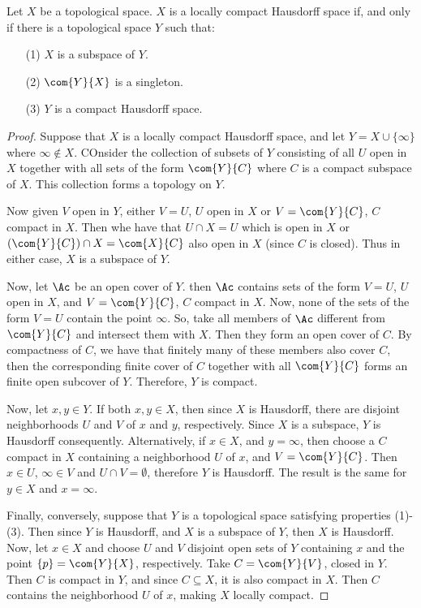 \begin{theorem}\label{3.8.1}
    Let $X$ be a topological space. $X$ is a locally compact Hausdorff space if,
    and only if there is a topological space $Y$ such that:
    \begin{enumerate}
        \item[(1)] $X$ is a subspace of  $Y$.

        \item[(2)] $\com{Y}{X}$ is a singleton.

        \item[(3)] $Y$ is a compact Hausdorff space.
    \end{enumerate}

\end{theorem}
\begin{proof}
    Suppose that  $X$ is a locally compact Hausdorff space, and let $Y=X
    \cup \{\infty\}$ where $\infty \notin X$. COnsider the collection of
    subsets of  $Y$ consisting of all $U$ open in  $X$ together with all sets of
    the form $\com{Y}{C}$ where $C$ is a compact subspace of  $X$. This
    collection forms a topology on  $Y$.

    Now given $V$ open in  $Y$, either  $V=U$,  $U$ open in  $X$ or
    $V=\com{Y}{C}$, $C$ compact in $X$. Then whe have that $U \cap X=U$ which is
    open in $X$ or  $(\com{Y}{C}) \cap X=\com{X}{C}$ also open in $X$  (since
    $C$ is closed). Thus in either case, $X$ is a subspace of $Y$.

    Now, let  $\Ac$ be an open cover of  $Y$. then  $\Ac$ contains sets of the
    form  $V=U$, $U$ open in $X$, and  $V=\com{Y}{C}$, $C$ compact in  $X$.
    Now, none of the sets of the form  $V=U$ contain the point  $\infty$. So,
    take all members of  $\Ac$ different from  $\com{Y}{C}$ and intersect them
    with $X$. Then they form an open cover of  $C$. By compactness of $C$, we
    have that finitely many of these members also cover  $C$, then the
    corresponding finite cover of  $C$ together with all  $\com{Y}{C}$ forms an
    finite open subcover of $Y$. Therefore,  $Y$ is compact.

    Now, let  $x,y \in Y$. If both  $x,y \in X$, then since  $X$ is Hausdorff,
    there are disjoint neighborhoods $U$ and $V$ of  $x$ and  $y$, respectively.
    Since $X$ is a subspace, $Y$ is Hausdorff consequently. Alternatively, if $x
    \in X$, and  $y=\infty$, then choose a $C$ compact in $X$ containing a
    neighborhood  $U$ of  $x$, and  $V=\com{Y}{C}$. Then $x \in U$, $\infty \in
    V$ and  $U \cap V=\emptyset$, therefore  $Y$ is Hausdorff. The result is the
    same for  $y \in X$ and  $x=\infty$.

    Finally, conversely, suppose that  $Y$ is a topological space satisfying
    properties (1)-(3). Then since $Y$ is Hausdorff, and  $X$ is a subspace of
    $Y$, then  $X$ is Hausdorff. Now, let $x \in X$ and choose $U$ and $V$
    disjoint open sets of $Y$ containing $x$ and the point $\{p\}=\com{Y}{X}$,
    respectively. Take $C=\com{Y}{V}$, closed in $Y$. Then  $C$ is compact in
    $Y$, and since $C \subseteq X$, it is also compact in $X$. Then  $C$
    contains the neighborhood  $U$ of  $x$, making  $X$ locally compact.
\end{proof}

